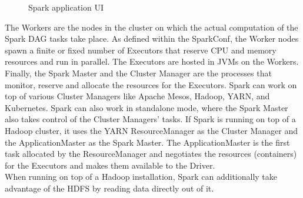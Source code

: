 \begin{figure}[htbp]
	\captionsetup[subfigure]{justification=centering}
	\centering
	\caption{Spark application UI}
	\label{appui}
\end{figure}
\FloatBarrier

\noindent The Workers are the nodes in the cluster on which the actual computation of the Spark DAG tasks take place. As defined within the SparkConf, the Worker nodes spawn a finite or fixed number of Executors that reserve CPU and memory resources and run in parallel. The Executors are hosted in JVMs on the Workers. Finally, the Spark Master and the Cluster Manager are the processes that monitor, reserve and allocate the resources for the Executors. Spark can work on top of various Cluster Managers like Apache Mesos, Hadoop, YARN, and Kubernetes. Spark can also work in standalone mode, where the Spark Master also takes control of the Cluster Managers' tasks. If Spark is running on top of a Hadoop cluster, it uses the YARN ResourceManager as the Cluster Manager and the ApplicationMaster as the Spark Master. The ApplicationMaster is the first task allocated by the ResourceManager and negotiates the resources (containers) for the Executors and makes them available to the Driver. \cite[pp. 49 ff]{sparkbook1}\\
When running on top of a Hadoop installation, Spark can additionally take advantage of the HDFS by reading data directly out of it.\\

